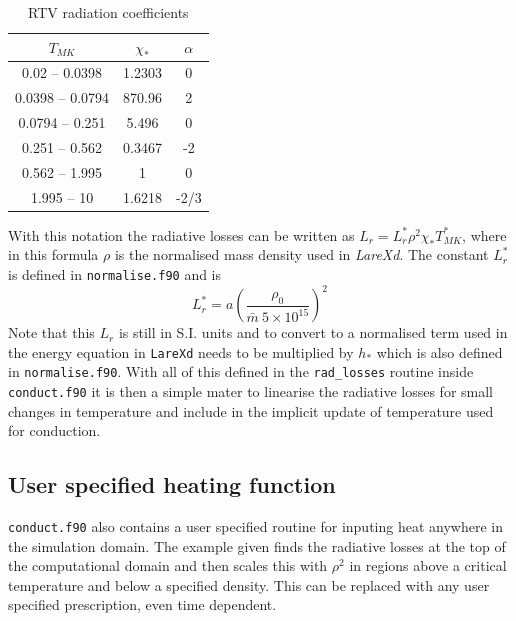 \documentclass[11pt]{article}
\begin{document}
\begin{table}[ht]
\caption{RTV radiation coefficients}
\centering
\begin{tabular}{c c c}
\hline\hline
$T_{MK}$ & $\chi_*$ & $\alpha$ \\ [0.5ex] %
\hline
0.02 -- 0.0398   & 1.2303 & 0 \\
0.0398 -- 0.0794 & 870.96 & 2 \\
0.0794 -- 0.251  & 5.496 & 0  \\
0.251 -- 0.562   & 0.3467 & -2 \\
0.562 -- 1.995   & 1 & 0 \\
1.995 -- 10      & 1.6218 & -2/3   \\[1ex]
\hline
\end{tabular}
\label{table:rtv}
\end{table}

With this notation the radiative losses can be written as $L_r=L_r^* \rho^2\chi_* T_{MK}^*$, where in this formula $\rho$ is the normalised mass density used in {\it LareXd}. The constant $L_r^*$ is defined in {\tt normalise.f90} and is
\[
L_r^*=a\left(\frac{\rho_0}{\bar{m}\ 5\times10^{15}} \right)^2
\]
Note that this $L_r$ is still in S.I. units and to convert to a normalised term used in the energy equation in {\tt LareXd} needs to be multiplied by  $h_*$ which is also defined in  {\tt normalise.f90}. With all of this defined in the {\tt rad\_losses} routine inside {\tt conduct.f90} it is then a simple mater to linearise the radiative losses for small changes in temperature and include in the implicit update of temperature used for conduction.


\subsection*{User specified heating function}
{\tt conduct.f90} also contains a user specified routine for inputing heat anywhere in the simulation domain. The example given finds the radiative losses at the top of the computational domain and then scales this with $\rho^2$ in regions above a critical temperature and below a specified density. This can be replaced with any user specified prescription, even time dependent.
\end{document}
